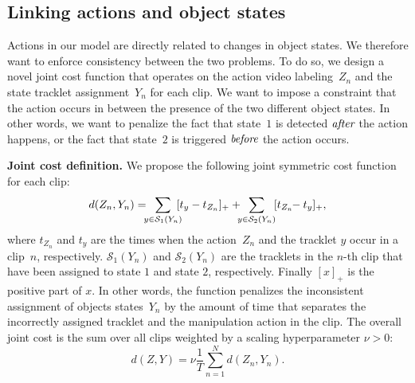 \subsection{Linking actions and object states}
\label{sec:joint}
Actions in our model are directly related to changes in object states.
We therefore want to enforce consistency between the two problems.
To do so, we design a novel joint cost function that operates on the action video labeling~$Z_n$ and the state tracklet assignment~$Y_n$ for each clip.
We want to impose a constraint that the action occurs in between the presence of the two different object states.
In other words, we want to penalize the fact that state~$1$ is detected $\emph{after}$ the action happens, or the fact that state~$2$ is triggered  $\emph{before}$ the action occurs.
%
%

\noindent\textbf{Joint cost definition.}
We propose the following joint symmetric cost function for each clip:
\vspace{-0.6mm}
\begin{align}
d(Z_n,Y_n) =   \hspace{-0.5em}\sum_{y\in\mathcal{S}_1(Y_n)} \!\!\! [t_y-t_{Z_n}]_{+}  + \hspace{-0.5em}\sum_{y\in\mathcal{S}_2(Y_n)}  \! [t_{Z_n} \!\!-t_y]_{+},
\label{eq:dist}
\end{align}
where $t_{Z_n}$ and $t_y$ are the times when the action~$Z_n$ and the tracklet $y$ occur in a clip~$n$, respectively.
$\mathcal{S}_1(Y_n)$ and $\mathcal{S}_2(Y_n)$ are the tracklets in the $n$-th clip that have been assigned to state $1$ and state $2$, respectively.
Finally $[x]_{+}$ is the positive part of $x$.
%
In other words, the function penalizes the inconsistent assignment of objects states~$Y_n$  by the
amount of time that separates the incorrectly assigned tracklet and the manipulation action in the clip.
%
The overall joint cost is the sum over all clips weighted by a scaling hyperparameter $\nu>0$:
\vspace{-0.7mm}
\begin{equation} 
d(Z,Y) = \nu \frac{1}{T} \sum_{n=1}^N d(Z_n,Y_n). \label{eq:distGlobal}
%
\end{equation}